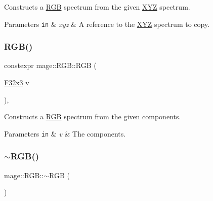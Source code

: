 Constructs a \hyperlink{structmage_1_1_r_g_b}{R\+GB} spectrum from the given \hyperlink{structmage_1_1_x_y_z}{X\+YZ} spectrum.


\begin{DoxyParams}[1]{Parameters}
\mbox{\tt in}  & {\em xyz} & A reference to the \hyperlink{structmage_1_1_x_y_z}{X\+YZ} spectrum to copy. \\
\hline
\end{DoxyParams}
\hypertarget{structmage_1_1_r_g_b_ab80d8120aabe4f52e8de6e99d1af7c8b}{}\label{structmage_1_1_r_g_b_ab80d8120aabe4f52e8de6e99d1af7c8b} 
\subsubsection{\texorpdfstring{R\+G\+B()}{RGB()}\hspace{0.1cm}{\footnotesize\ttfamily [7/7]}}
{\footnotesize\ttfamily constexpr mage\+::\+R\+G\+B\+::\+R\+GB (\begin{DoxyParamCaption}\item[{\hyperlink{namespacemage_a73fbe0da4b8d5bc156bb8453e5b63a17}{F32x3}}]{v }\end{DoxyParamCaption})\hspace{0.3cm}{\ttfamily [explicit]}, {\ttfamily [noexcept]}}

Constructs a \hyperlink{structmage_1_1_r_g_b}{R\+GB} spectrum from the given components.


\begin{DoxyParams}[1]{Parameters}
\mbox{\tt in}  & {\em v} & The components. \\
\hline
\end{DoxyParams}
\hypertarget{structmage_1_1_r_g_b_a2c01428e1da4ec354b85320a905beab3}{}\label{structmage_1_1_r_g_b_a2c01428e1da4ec354b85320a905beab3} 
\subsubsection{\texorpdfstring{$\sim$\+R\+G\+B()}{~RGB()}}
{\footnotesize\ttfamily mage\+::\+R\+G\+B\+::$\sim$\+R\+GB (\begin{DoxyParamCaption}{ }\end{DoxyParamCaption})\hspace{0.3cm}{\ttfamily [default]}}

